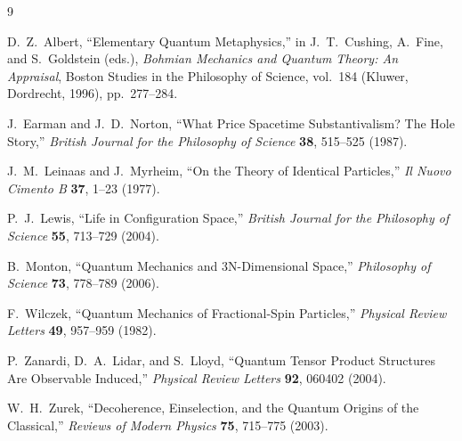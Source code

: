 \documentclass[11pt]{article}
\begin{document}
\begin{thebibliography}{9}

D.~Z.~Albert, ``Elementary Quantum Metaphysics,'' in J.~T.~Cushing, A.~Fine, and S.~Goldstein (eds.), \emph{Bohmian Mechanics and Quantum Theory: An Appraisal}, Boston Studies in the Philosophy of Science, vol.~184 (Kluwer, Dordrecht, 1996), pp.~277--284.

J.~Earman and J.~D.~Norton, ``What Price Spacetime Substantivalism? The Hole Story,'' \emph{British Journal for the Philosophy of Science} \textbf{38}, 515--525 (1987).

J.~M.~Leinaas and J.~Myrheim, ``On the Theory of Identical Particles,'' \emph{Il Nuovo Cimento B} \textbf{37}, 1--23 (1977).

P.~J.~Lewis, ``Life in Configuration Space,'' \emph{British Journal for the Philosophy of Science} \textbf{55}, 713--729 (2004).

B.~Monton, ``Quantum Mechanics and 3N-Dimensional Space,'' \emph{Philosophy of Science} \textbf{73}, 778--789 (2006).

F.~Wilczek, ``Quantum Mechanics of Fractional-Spin Particles,'' \emph{Physical Review Letters} \textbf{49}, 957--959 (1982).

P.~Zanardi, D.~A.~Lidar, and S.~Lloyd, ``Quantum Tensor Product Structures Are Observable Induced,'' \emph{Physical Review Letters} \textbf{92}, 060402 (2004).

W.~H.~Zurek, ``Decoherence, Einselection, and the Quantum Origins of the Classical,'' \emph{Reviews of Modern Physics} \textbf{75}, 715--775 (2003).

\end{thebibliography}
\end{document}
